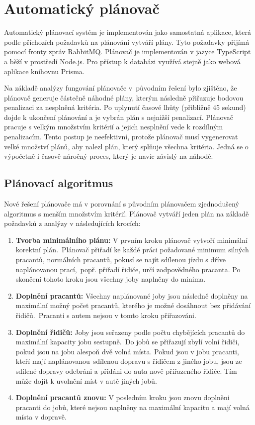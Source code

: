 \section{Automatický plánovač}
\label{sec:planner}

Automatický plánovací systém je implementován jako samostatná aplikace, která podle příchozích požadavků na plánování vytváří
plány. Tyto požadavky přijímá pomocí fronty zpráv RabbitMQ. Plánovač je implementován v jazyce TypeScript a běží v prostředí Node.js.
Pro přístup k databázi využívá stejně jako webová aplikace knihovnu Prisma.

Na základě analýzy fungování plánovače v~původním řešení bylo zjištěno, že plánovač generuje částečně náhodné plány, kterým následně přiřazuje
bodovou penalizaci za nesplněná kritéria. Po uplynutí časové lhůty (přibližně 45 sekund) dojde k ukončení plánování
a je vybrán plán s nejnižší penalizací. Plánovač pracuje s velkým množstvím kritérií a jejich nesplnění vede k rozdílným penalizacím.
Tento postup je neefektivní, protože plánovač musí vygenerovat velké množství plánů, aby
nalezl plán, který splňuje všechna kritéria. Jedná se o výpočetně i časově náročný proces, který je navíc závislý na náhodě.

\subsection{Plánovací algoritmus}

Nové řešení plánovače má v porovnání s původním plánovačem zjednodušený algoritmus s menším množstvím kritérií.
Plánovač vytváří jeden plán na základě požadavků z analýzy v následujících krocích:

\begin{enumerate}
    \item \textbf{Tvorba minimálního plánu:} V prvním kroku plánovač vytvoří minimální korektní plán.\ 
    Plánovač přiřadí ke každé práci požadované minimum silných pracantů, normálních pracantů, pokusí se najít sdílenou jízdu s dříve naplánovanou prací,\ 
    popř. přiřadí řidiče, určí zodpovědného pracanta. Po skončení tohoto kroku jsou všechny joby naplněny do minima. 
    \item \textbf{Doplnění pracantů:} Všechny naplánované joby jsou následně doplněny na maximální možný počet pracantů, kterého je možné dosáhnout bez přidávání řidičů.\ 
    Pracanti s autem nejsou v tomto kroku přiřazováni.
    \item \textbf{Doplnění řidičů:} Joby jsou seřazeny podle počtu chybějících pracantů do maximální kapacity jobu sestupně.\ 
    Do jobů se přiřazují zbylí volní řidiči, pokud jsou na jobu alespoň dvě volná místa. Pokud jsou v jobu pracanti, kteří mají naplánovanou\ 
    sdílenou dopravu s řidičem z jiného jobu, jsou ze sdílené dopravy odebráni a přidáni do auta nově přiřazeného řidiče. Tím může dojít k uvolnění míst v autě jiných jobů.
    \item \textbf{Doplnění pracantů znovu:} V posledním kroku jsou znovu doplněni pracanti do jobů, které nejsou naplněny na maximální kapacitu a mají volná místa v dopravě.
\end{enumerate}

